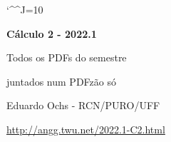 \documentclass[oneside,12pt]{article}
\begin{document}

\def\drafturl{http://angg.twu.net/LATEX/2022-1-C2.pdf}
\def\drafturl{http://angg.twu.net/2022.1-C2.html}
\def\draftfooter{\tiny \href{\drafturl}{\jobname{}} \ColorBrown{\shorttoday{} \hours}}

\catcode`\^^J=10
\pu



%

\thispagestyle{empty}

\begin{center}

\vspace*{1.2cm}

{\bf \Large Cálculo 2 - 2022.1}

\bsk

Todos os PDFs do semestre

juntados num PDFzão só

\bsk

Eduardo Ochs - RCN/PURO/UFF

\url{http://angg.twu.net/2022.1-C2.html}

\end{center}

\newpage




\end{document}
